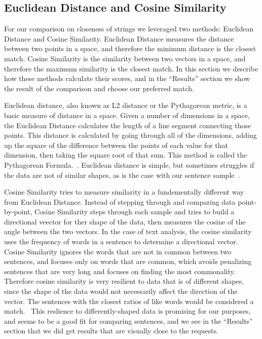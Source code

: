 \documentclass[runningheads]{llncs}
\begin{document}
	\subsection{Euclidean Distance and Cosine Similarity}	
	For our comparison on closeness of strings we leveraged two methods: Euclidean Distance and Cosine Similarity. Euclidean Distance measures the distance between two points in a space, and therefore the minimum distance is the closest match. Cosine Similarity is the similarity between two vectors in a space, and therefore the maximum similarity is the closest match. In this section we describe how these methods calculate their scores, and in the ``Results'' section we show the result of the comparison and choose our preferred match.
	
Euclidean distance, also known as L2 distance or the Pythagorean metric, is a basic measure of distance in a space. Given a number of dimensions in a space, the Euclidean Distance calculates the length of a line segment connecting those points. This distance is calculated by going through all of the dimensions, adding up the square of the difference between the points of each value for that dimension, then taking the square root of that sum. This method is called the Pythagorean Formula.~\cite{ref_url19}. Euclidean distance is simple, but sometimes struggles if the data are not of similar shapes, as is the case with our sentence sample~\cite{ref_url19}.

Cosine Similarity tries to measure similarity in a fundementally different way from Euclidean Distance. Instead of stepping through and comparing data point-by-point, Cosine Similarity steps through each sample and tries to build a directional veector for ther shape of the data, then measures the cosine of the angle between the two vectors. In the case of text analysis, the cosine similarity uses the frequency of words in a sentence to determine a directional vector. Cosine Similarity ignores the words that are not in common between two sentences, and focuses only on words that are common, which avoids penalizing sentences that are very long and focuses on finding the most commonality. Therefore cosine similarity is very resilient to data that is of different shapes, since the shape of the data would not necessarily affect the direction of the vector. The sentences with the closest ratios of like words would be considered a match.~\cite{ref_book1} This reslience to differently-shaped data is promising for our purposes, and seems to be a good fit for comparing sentences, and we see in the ``Results'' section that we did get results that are visually close to the requests.
\end{document}
